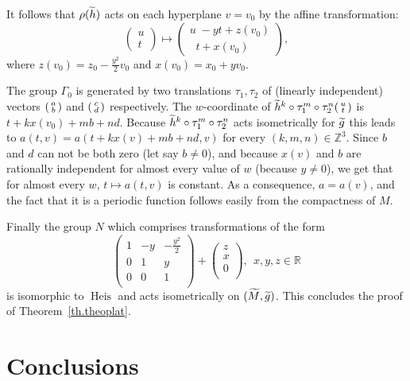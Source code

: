 \documentclass[11pt]{article}
\theoremstyle{definition}
\numberwithin{equation}{section}
\numberwithin{figure}{section}
\numberwithin{table}{section}
\DeclareMathOperator{\Heis}{Heis}
\newcommand{\tm}{\tilde{{M}}}
\newcommand{\tth}{\tilde{h}}
\newcommand*\RR{\mathbb{R}}
\newcommand*\ZZ{\mathbb{Z}}
\let\oldtilde\tilde
\renewcommand*\tilde[1]{\mathchoice{\widetilde{#1}}{\widetilde{#1}}{\widetilde{#1}}{\oldtilde{#1}}}
\newenvironment{smallpmatrix}{\left(\begin{smallmatrix}}{\end{smallmatrix}\right)}
\begin{document}
It follows that $\rho(\tth)$ acts on each hyperplane $v=v_0$ by the affine transformation:
\[
\begin{pmatrix} u\\ t
\end{pmatrix} \mapsto 
\begin{pmatrix} u\;-yt + z(v_0)\\\;\;t+ x(v_0)
\end{pmatrix} ,
\]
where $z(v_0)=z_0 - \frac{y^2}{2}v_0$ and $x(v_0)=x_0 + y v_0$.

The group $\Gamma_0$ is generated by two translations $\tau_1,\tau_2$ of (linearly independent) vectors $
\begin{smallpmatrix} a\\ b
\end{smallpmatrix}$ and $\begin{smallpmatrix} c\\ d
\end{smallpmatrix}$ respectively.
The $w$-coordinate of $\tth^k\circ \tau_1^m \circ \tau_2 ^n
\begin{smallpmatrix} u\\ t
\end{smallpmatrix}$
is $t+k x(v_0)+mb+nd$. Because $\tth^k\circ \tau_1^m \circ \tau_2 ^n$ acts isometrically for $\tilde{g}$ this leads to $a(t,v)=a(t+k x(v)+mb+nd,v)$ for every $(k,m,n) \in \ZZ^3$. Since $b$ and $d$ can not be both zero (let say $b \not =0$), and because $x(v)$ and $b$ are rationally independent for almost every value of $w$ (because $y \not =0$), we get that for almost every $w$, $t \mapsto a(t,v)$ is constant. As a consequence, $a=a(v)$, and the fact that it is a periodic function follows easily from the compactness of $M$.

Finally the group $N$ which comprises transformations of the form
\[
\begin{pmatrix}
1&- y&-\frac{ y^2}{2 }\\ 0&1 & y\\0&0& 1\\
\end{pmatrix} +
\begin{pmatrix} z\\ x\\ 0 \\
\end{pmatrix}, \ \ x,y,z \in \RR
\]
is isomorphic to $\Heis$ and acts isometrically on $(\tm,\tilde{g})$. This concludes the proof of Theorem~\ref{th.theoplat}.


\section{Conclusions}\label{sec.fin}
\end{document}
